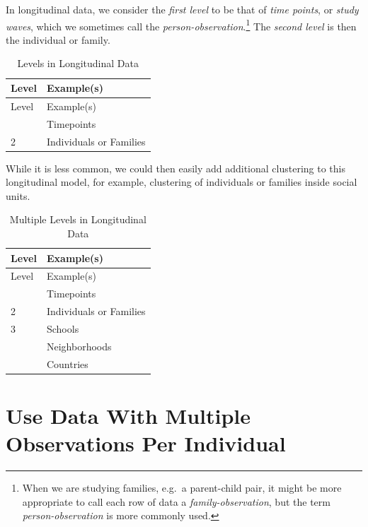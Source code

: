 \documentclass[
  letterpaper,
  DIV=11,
  numbers=noendperiod]{scrreprt}
\begin{document}
In longitudinal data, we consider the \emph{first level} to be that of
\emph{time points}, or \emph{study waves}, which we sometimes call the
\emph{person-observation}.\footnote{When we are studying families,
  e.g.~a parent-child pair, it might be more appropriate to call each
  row of data a \emph{family-observation}, but the term
  \emph{person-observation} is more commonly used.} The \emph{second
level} is then the individual or family.

\hypertarget{tbl-levelslongitudinal}{}
\begin{longtable}[]{@{}ll@{}}
\caption{\label{tbl-levelslongitudinal}Levels in Longitudinal
Data}\tabularnewline
\toprule\noalign{}
Level & Example(s) \\
\midrule\noalign{}
\endfirsthead
\toprule\noalign{}
Level & Example(s) \\
\midrule\noalign{}
\endhead
\bottomrule\noalign{}
\endlastfoot
1 & Timepoints \\
2 & Individuals or Families \\
\end{longtable}

While it is less common, we could then easily add additional clustering
to this longitudinal model, for example, clustering of individuals or
families inside social units.

\hypertarget{tbl-levelslongitudinal2}{}
\begin{longtable}[]{@{}ll@{}}
\caption{\label{tbl-levelslongitudinal2}Multiple Levels in Longitudinal
Data}\tabularnewline
\toprule\noalign{}
Level & Example(s) \\
\midrule\noalign{}
\endfirsthead
\toprule\noalign{}
Level & Example(s) \\
\midrule\noalign{}
\endhead
\bottomrule\noalign{}
\endlastfoot
1 & Timepoints \\
2 & Individuals or Families \\
3 & Schools \\
& Neighborhoods \\
& Countries \\
\end{longtable}

\hypertarget{use-data-with-multiple-observations-per-individual}{%
\section{Use Data With Multiple Observations Per
Individual}\label{use-data-with-multiple-observations-per-individual}}
\end{document}
